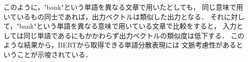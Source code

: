 		このように，"bank"という単語を異なる文章で用いたとしても，
		同じ意味で用いているもの同士であれば，出力ベクトルは類似した出力となる．
		それに対して，"bank"という単語を異なる意味で用いている文章で比較をすると，
		入力としては同じ単語であるにもかかわらず出力ベクトルの類似度は低下する．
		このような結果から，BERTから取得できる単語分散表現には
		文脈考慮性があるということが示唆されている．




